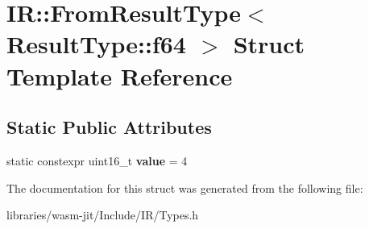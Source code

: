 \hypertarget{struct_i_r_1_1_from_result_type_3_01_result_type_1_1f64_01_4}{}\section{IR\+:\+:From\+Result\+Type$<$ Result\+Type\+:\+:f64 $>$ Struct Template Reference}
\label{struct_i_r_1_1_from_result_type_3_01_result_type_1_1f64_01_4}
\subsection*{Static Public Attributes}
\begin{DoxyCompactItemize}
\item 
\mbox{\label{struct_i_r_1_1_from_result_type_3_01_result_type_1_1f64_01_4_adf98d5e2338b8ff5ee70cd910ae2e438}} 
static constexpr uint16\+\_\+t {\bfseries value} = 4
\end{DoxyCompactItemize}


The documentation for this struct was generated from the following file\+:\begin{DoxyCompactItemize}
\item 
libraries/wasm-\/jit/\+Include/\+I\+R/Types.\+h\end{DoxyCompactItemize}
